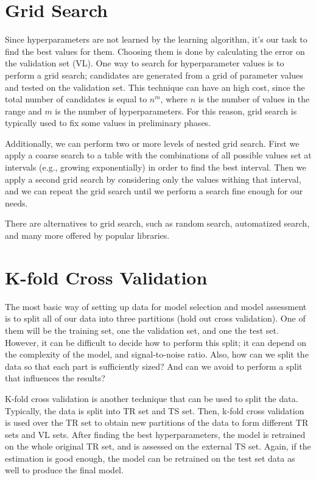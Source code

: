\section{Grid Search}

Since hyperparameters are not learned by the learning algorithm, it's our task to find the best values for them. Choosing them is done by calculating the error on the validation set (VL). One way to search for hyperparameter values is to perform a grid search; candidates are generated from a grid of parameter values and tested on the validation set. This technique can have an high cost, since the total number of candidates is equal to $n^m$, where $n$ is the number of values in the range and $m$ is the number of hyperparameters. For this reason, grid search is typically used to fix some values in preliminary phases.

Additionally, we can perform two or more levels of nested grid search. First we apply a coarse search to a table with the combinations of all possible values set at intervals (e.g., growing exponentially) in order to find the best interval. Then we apply a second grid search by considering only the values withing that interval, and we can repeat the grid search until we perform a search fine enough for our needs.

There are alternatives to grid search, such as random search, automatized search, and many more offered by popular libraries.

\section{K-fold Cross Validation}

The most basic way of setting up data for model selection and model assessment is to split all of our data into three partitions (hold out cross validation). One of them will be the training set, one the validation set, and one the test set. However, it can be difficult to decide how to perform this split; it can depend on the complexity of the model, and signal-to-noise ratio. Also, how can we split the data so that each part is sufficiently sized? And can we avoid to perform a split that influences the results?

K-fold cross validation is another technique that can be used to split the data. Typically, the data is split into TR set and TS set. Then, k-fold cross validation is used over the TR set to obtain new partitions of the data to form different TR sets and VL sets. After finding the best hyperparameters, the model is retrained on the whole original TR set, and is assessed on the external TS set. Again, if the estimation is good enough, the model can be retrained on the test set data as well to produce the final model.

